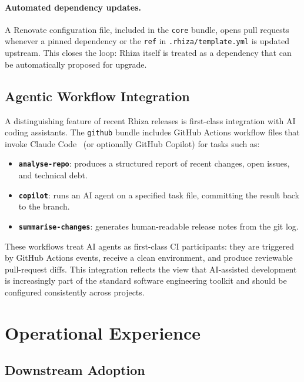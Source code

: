 \documentclass[12pt,a4paper]{article}
\begin{document}
\paragraph{Automated dependency updates.} A Renovate configuration file, included in the \texttt{core} bundle, opens pull requests whenever a pinned dependency or the \texttt{ref} in \texttt{.rhiza/template.yml} is updated upstream. This closes the loop: Rhiza itself is treated as a dependency that can be automatically proposed for upgrade.

\subsection{Agentic Workflow Integration}

A distinguishing feature of recent Rhiza releases is first-class integration with AI coding assistants. The \texttt{github} bundle includes GitHub Actions workflow files that invoke Claude Code~\cite{claudecode} (or optionally GitHub Copilot) for tasks such as:

\begin{itemize}
  \item \textbf{\texttt{analyse-repo}}: produces a structured report of recent changes, open issues, and technical debt.
  \item \textbf{\texttt{copilot}}: runs an AI agent on a specified task file, committing the result back to the branch.
  \item \textbf{\texttt{summarise-changes}}: generates human-readable release notes from the git log.
\end{itemize}

These workflows treat AI agents as first-class CI participants: they are triggered by GitHub Actions events, receive a clean environment, and produce reviewable pull-request diffs. This integration reflects the view that AI-assisted development is increasingly part of the standard software engineering toolkit and should be configured consistently across projects.

\section{Operational Experience}
\label{sec:experience}

\subsection{Downstream Adoption}
\end{document}
